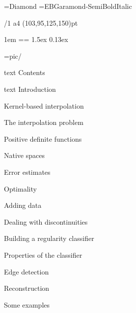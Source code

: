 \useOpTeX  %


\hyperlinks \Black \Black
{}

\enlang
\fontfam[TypewriterMT]
\fontfam[BaskervilleMT]
\typosize[12.2/14.42]

\font\symbols=Diamond %
\def\QED{\hbox{\symbols\resizethefont \,❖}}
\font\boldmathfont=EBGaramond-SemiBoldItalic
\famvardef\tt{\TypewriterMT{}\typoscale[870/]\rm}


\margins/1 a4 (103,95,125,150)pt


\parindent 1em
\iindent=\parindent \ttindent=\parindent
\parskip 1.5ex
 0.13ex

\picdir={pic/}

\bgroup
\let\_mtext\ignoreit
\nonum\notoc\chap Contents
\egroup
\tocpage


\bgroup
\let\_mtext\ignoreit
\nonum\chap Introduction
\egroup

\chap Kernel-based interpolation

\sec The interpolation problem


\sec[positivesec] Positive definite functions


\sec Native spaces


\sec[errorsec] Error estimates


\sec Optimality


\sec[addingsec] Adding data


\chap Dealing with discontinuities

\sec[buildingsec] Building a regularity classifier


\sec Properties of the classifier


\sec Edge detection

\sec Reconstruction

\sec Some examples






